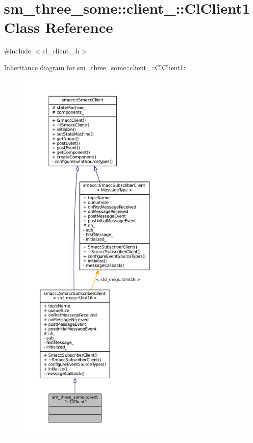 \hypertarget{classsm__three__some_1_1client__1_1_1ClClient1}{}\section{sm\+\_\+three\+\_\+some\+:\+:client\+\_\+:\+:Cl\+Client1 Class Reference}
\label{classsm__three__some_1_1client__1_1_1ClClient1}


{\ttfamily \#include $<$cl\+\_\+client\+\_.\+h$>$}



Inheritance diagram for sm\+\_\+three\+\_\+some\+:\+:client\+\_\+:\+:Cl\+Client1\+:
\nopagebreak
\begin{figure}[H]
\begin{center}
\leavevmode
\includegraphics[height=550pt]{classsm__three__some_1_1client__1_1_1ClClient1__inherit__graph}
\end{center}
\end{figure}


